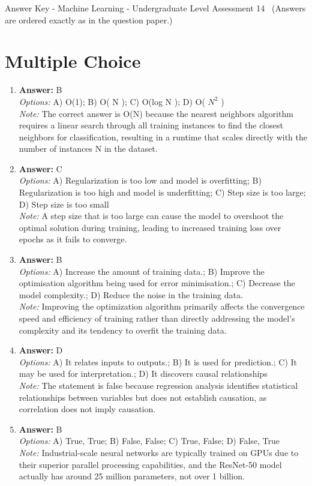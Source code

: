 \documentclass[12pt]{article}
\begin{document}
\begin{center}
Answer Key - Machine Learning - Undergraduate Level Assessment 14 \
\small (Answers are ordered exactly as in the question paper.)
\end{center}

\section*{Multiple Choice}
\begin{enumerate}[label=\arabic*.]
\item \textbf{Answer:} B
\\ \textit{Options:} A) O(1); B) O( N ); C) O(log N ); D) O( $N^2$ )
\\ \textit{Note:} The correct answer is O(N) because the nearest neighbors algorithm requires a linear search through all training instances to find the closest neighbors for classification, resulting in a runtime that scales directly with the number of instances N in the dataset.
\item \textbf{Answer:} C
\\ \textit{Options:} A) Regularization is too low and model is overfitting; B) Regularization is too high and model is underfitting; C) Step size is too large; D) Step size is too small
\\ \textit{Note:} A step size that is too large can cause the model to overshoot the optimal solution during training, leading to increased training loss over epochs as it fails to converge.
\item \textbf{Answer:} B
\\ \textit{Options:} A) Increase the amount of training data.; B) Improve the optimisation algorithm being used for error minimisation.; C) Decrease the model complexity.; D) Reduce the noise in the training data.
\\ \textit{Note:} Improving the optimization algorithm primarily affects the convergence speed and efficiency of training rather than directly addressing the model's complexity and its tendency to overfit the training data.
\item \textbf{Answer:} D
\\ \textit{Options:} A) It relates inputs to outputs.; B) It is used for prediction.; C) It may be used for interpretation.; D) It discovers causal relationships
\\ \textit{Note:} The statement is false because regression analysis identifies statistical relationships between variables but does not establish causation, as correlation does not imply causation.
\item \textbf{Answer:} B
\\ \textit{Options:} A) True, True; B) False, False; C) True, False; D) False, True
\\ \textit{Note:} Industrial-scale neural networks are typically trained on GPUs due to their superior parallel processing capabilities, and the ResNet-50 model actually has around 25 million parameters, not over 1 billion.
\end{enumerate}
\end{document}
